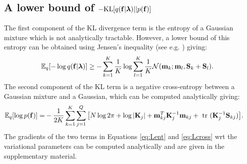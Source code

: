 \subsection[A lower bound of the KL divergence term]{A lower bound of $-\text{KL}[q(\mathbf{f} | \boldsymbol{\lambda}) || p(\mathbf{f})]$ \label{sec:klbound}}
The first component of the KL divergence term is the entropy of a Gaussian mixture which is not analytically tractable.
However, a lower bound of this entropy can be obtained using Jensen's inequality (see e.g. \cite{ihuber-et-al-2008}) giving:
\begin{align}
\label{eq:Lent}
\mathbb{E}_q [ - \log q(\mathbf{f} | \boldsymbol{\lambda})] 
\ge - \sum_{k=1}^K \frac{1}{K} \log \sum_{l=1}^K \frac{1}{K} \mathcal{N}( \mathbf{m}_k; \mathbf{m}_l , \mathbf{S}_k + \mathbf{S}_l) \text{.}
\end{align}
The second component of the KL term is a negative cross-entropy between a Gaussian mixture and 
a Gaussian, which can be computed analytically giving:
\begin{align}
\mathbb{E}_q  [\log p(\mathbf{f})] 
=&  -\frac{1}{2K} \sum_{k=1}^K \sum_{j=1}^Q \big[ N \log 2\pi  + \log |\mathbf{K}_j| + \mathbf{m}_{kj}^T \mathbf{K}_j^{-1} \mathbf{m}_{kj} + \mbox{ \rm tr } (\mathbf{K}_j^{-1} \mathbf{S}_{kj}) \big].
\label{eq:Lcross}
\end{align}
The gradients of the two terms in Equations \eqref{eq:Lent} and \eqref{eq:Lcross} wrt  the variational parameters can be computed analytically and 
are given in the supplementary material.
%
